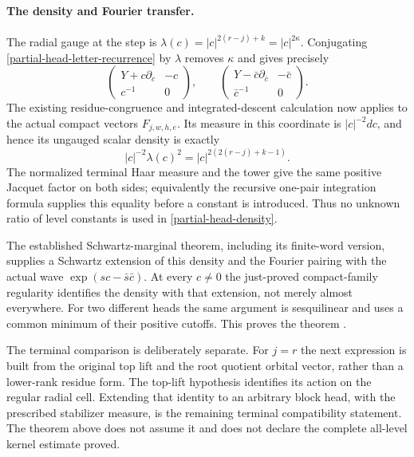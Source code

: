 \paragraph{The density and Fourier transfer.}
The radial gauge at the step is
$\lambda(c)=|c|^{2(r-j)+k}=|c|^{2\kappa}$.
Conjugating \eqref{partial-head-letter-recurrence} by $\lambda$
removes $\kappa$ and gives precisely
\[
       \begin{pmatrix}Y+c\partial_c&-c\\c^{-1}&0\end{pmatrix},
       \qquad
       \begin{pmatrix}Y-\bar c\partial_{\bar c}&-\bar c\\
                         \bar c^{-1}&0\end{pmatrix}.
\]
The existing residue-congruence and integrated-descent calculation
now applies to the actual compact vectors $F_{j,w,h,e}$.
Its measure in this coordinate is $|c|^{-2}dc$, and hence its
ungauged scalar density is exactly
\[
             |c|^{-2}\lambda(c)^2
                      =|c|^{2(2(r-j)+k-1)}.
\]
The normalized terminal Haar measure and the tower give the same
positive Jacquet factor on both sides; equivalently the recursive
one-pair integration formula supplies this equality before a
constant is introduced.  Thus no unknown ratio of level constants
is used in \eqref{partial-head-density}.

The established Schwartz-marginal theorem, including its finite-word
version, supplies a Schwartz extension of this density and the
Fourier pairing with the actual wave $\exp(sc-\bar s\bar c)$.
At every $c\ne0$ the just-proved compact-family regularity identifies
the density with that extension, not merely almost everywhere.
For two different heads the same argument is sesquilinear and
uses a common minimum of their positive cutoffs.
This proves the theorem \cite{partial-head-source,partial-head-established}.

The terminal comparison is deliberately separate.  For $j=r$ the
next expression is built from the original top lift and the root
quotient orbital vector, rather than a lower-rank residue form.
The top-lift hypothesis identifies its action on the regular radial
cell.  Extending that identity to an arbitrary block head, with
the prescribed stabilizer measure, is the remaining terminal
compatibility statement.  The theorem above does not assume it
and does not declare the complete all-level kernel estimate proved.
